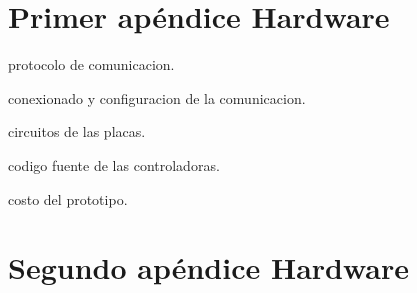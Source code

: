 
\section{Primer ap\'endice Hardware}

protocolo de comunicacion.
\label{hA_protocolo}

conexionado y configuracion de la comunicacion.

circuitos de las placas.

codigo fuente de las controladoras.

costo del prototipo.

\section{Segundo ap\'endice Hardware}

